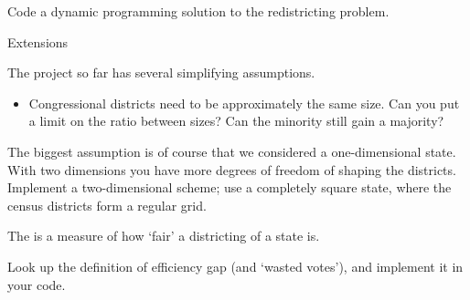 \begin{comment}
\begin{itemize}
\item If you know the results for districting ten voters:
  \begin{itemize}
  \item you know the overall district majority, and
  \item you know the majority in the last district
  \end{itemize}
\item then for eleven voters you can
  \begin{itemize}
  \item add the new voter to the previous district, and compute the
    new majorities, overall and in the last district, or
  \item turn the new voter into a new district, and compute the two majorities.
  \end{itemize}
\item You need to compute the implications of adding the new voter,
  once for each possible districting of ten voters. 
\end{itemize}
\end{comment}

\begin{exercise}
  Code a dynamic programming solution to the redistricting problem. 
\end{exercise}

 {Extensions}

The project so far has several simplifying assumptions.
\begin{itemize}
\item Congressional districts need to be approximately the same
  size. Can you put a limit on the ratio between sizes? Can the
  minority still gain a majority?
\end{itemize}

\begin{exercise}
  The biggest assumption is of course that we considered a
  one-dimensional state. With two dimensions you have more degrees of
  freedom of shaping the districts. Implement a two-dimensional
  scheme; use a completely square state, where the census districts
  form a regular grid.
\end{exercise}

The  is a measure of how `fair' a
districting of a state is. 

\begin{exercise}
  Look up the definition of efficiency gap (and `wasted votes'), and
  implement it in your code.
\end{exercise}
